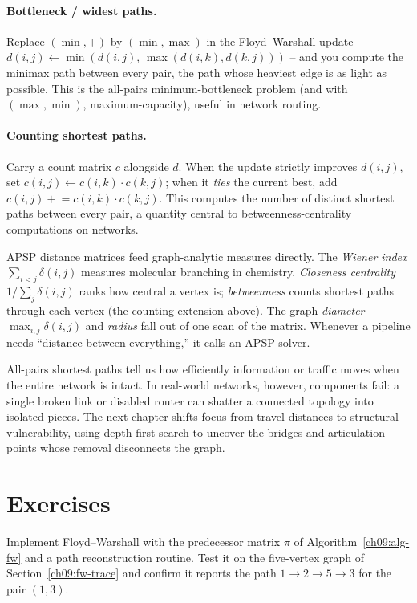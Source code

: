\paragraph{Bottleneck / widest paths.} Replace $(\min,+)$ by $(\min,\max)$ in the Floyd--Warshall
update -- $d(i,j)\leftarrow\min(d(i,j),\,\max(d(i,k),d(k,j)))$ -- and you compute the minimax path between
every pair, the path whose heaviest edge is as light as possible. This is the all-pairs minimum-bottleneck
problem (and with $(\max,\min)$, maximum-capacity), useful in network routing.

\paragraph{Counting shortest paths.} Carry a count matrix $c$ alongside $d$. When the update strictly
improves $d(i,j)$, set $c(i,j)\leftarrow c(i,k)\cdot c(k,j)$; when it \emph{ties} the current best, add
$c(i,j)\mathrel{+}= c(i,k)\cdot c(k,j)$. This computes the number of distinct shortest paths between every
pair, a quantity central to betweenness-centrality computations on networks.

\begin{applicationbox}
APSP distance matrices feed graph-analytic measures directly. The \emph{Wiener index}
$\sum_{i<j}\delta(i,j)$ measures molecular branching in chemistry. \emph{Closeness centrality}
$1/\sum_j\delta(i,j)$ ranks how central a vertex is; \emph{betweenness} counts shortest paths through each
vertex (the counting extension above). The graph \emph{diameter} $\max_{i,j}\delta(i,j)$ and \emph{radius}
fall out of one scan of the matrix. Whenever a pipeline needs ``distance between everything,'' it calls an APSP
solver.
\end{applicationbox}

All-pairs shortest paths tell us how efficiently information or traffic moves when the entire network is intact.
In real-world networks, however, components fail: a single broken link or disabled router can shatter a connected
topology into isolated pieces.
The next chapter shifts focus from travel distances to structural vulnerability, using depth-first search to uncover
the bridges and articulation points whose removal disconnects the graph.

\section{Exercises}
\label{ch09:exercises}

\begin{exercise}
Implement Floyd--Warshall with the predecessor matrix $\pi$ of Algorithm~\ref{ch09:alg-fw} and a path
reconstruction routine. Test it on the five-vertex graph of Section~\ref{ch09:fw-trace} and confirm it
reports the path $1\to2\to5\to3$ for the pair $(1,3)$.
\end{exercise}

